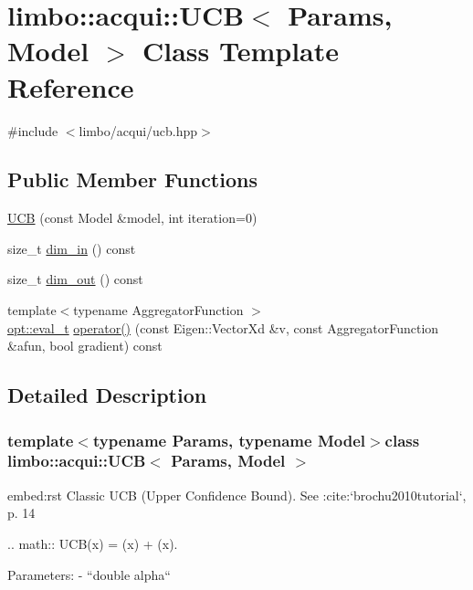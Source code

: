 \hypertarget{classlimbo_1_1acqui_1_1_u_c_b}{}\section{limbo\+:\+:acqui\+:\+:U\+C\+B$<$ Params, Model $>$ Class Template Reference}
\label{classlimbo_1_1acqui_1_1_u_c_b}


{\ttfamily \#include $<$limbo/acqui/ucb.\+hpp$>$}

\subsection*{Public Member Functions}
\begin{DoxyCompactItemize}
\item 
\hyperlink{classlimbo_1_1acqui_1_1_u_c_b_ae4410ba09273ea88b36130ea916fcc60}{U\+C\+B} (const Model \&model, int iteration=0)
\item 
size\+\_\+t \hyperlink{classlimbo_1_1acqui_1_1_u_c_b_ab922a11b709216f35db6ee83fcb86ed5}{dim\+\_\+in} () const 
\item 
size\+\_\+t \hyperlink{classlimbo_1_1acqui_1_1_u_c_b_aa6870bb7764a6f729db39f86eb005d54}{dim\+\_\+out} () const 
\item 
{\footnotesize template$<$typename Aggregator\+Function $>$ }\\\hyperlink{group__opt__tools_ga7fc87080ebf563d050fc547d25528ef0}{opt\+::eval\+\_\+t} \hyperlink{classlimbo_1_1acqui_1_1_u_c_b_a029c5489c29e294e50e0d83a203c9572}{operator()} (const Eigen\+::\+Vector\+Xd \&v, const Aggregator\+Function \&afun, bool gradient) const 
\end{DoxyCompactItemize}


\subsection{Detailed Description}
\subsubsection*{template$<$typename Params, typename Model$>$class limbo\+::acqui\+::\+U\+C\+B$<$ Params, Model $>$}

\begin{DoxyVerb}embed:rst
Classic UCB (Upper Confidence Bound). See :cite:`brochu2010tutorial`, p. 14

  .. math::
    UCB(x) = \mu(x) + \alpha \sigma(x).

Parameters:
  - ``double alpha``
\end{DoxyVerb}
 

